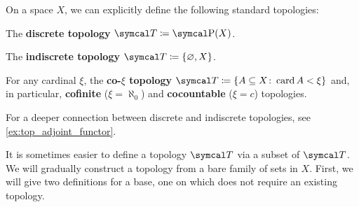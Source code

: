\begin{definition}\label{def:standard_topologies}
  On a space \( X \), we can explicitly define the following standard topologies:
  \begin{defenum}
    \item\label{def:standard_topologies/discrete} The \textbf{discrete topology} \( \Cal{T} \coloneqq \Power(X) \).
    \item\label{def:standard_topologies/indiscrete} The \textbf{indiscrete topology} \( \Cal{T} \coloneqq \{ \varnothing, X \} \).
    \item\label{def:standard_topologies/co_cardinal} For any cardinal \( \xi \), the \textbf{co-\( \xi \) topology} \( \Cal{T} \coloneqq \{ A \subseteq X \colon \Card A < \xi \} \) and, in particular, \textbf{cofinite} (\( \xi = \aleph_0 \)) and \textbf{cocountable} (\( \xi = c \)) topologies.
  \end{defenum}

  For a deeper connection between discrete and indiscrete topologies, see \cref{ex:top_adjoint_functor}.
\end{definition}

\begin{note}\label{note:abritrary_family_to_topology}
  It is sometimes easier to define a topology \( \Cal{T} \) via a subset of \( \Cal{T} \). We will gradually construct a topology from a bare family of sets in \( X \). First, we will give two definitions for a base, one on which does not require an existing topology.
\end{note}

